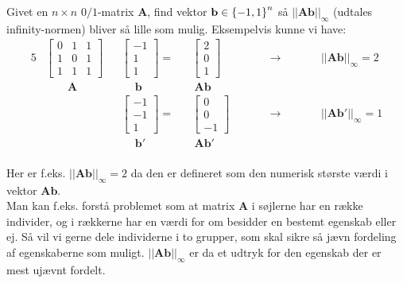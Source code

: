Givet en $n \times n$ $0/1$-matrix $\mathbf A$, find vektor $\mathbf b \in \left\{ -1, 1 \right\}^n$ så $||\mathbf{Ab}||_\infty$ (udtales infinity-normen) bliver så lille som mulig. Eksempelvis kunne vi have:
\begin{alignat*}{5}
  &\begin{bmatrix}
  0 & 1 & 1\\
  1 & 0 & 1\\
  1 & 1 & 1
  \end{bmatrix}
  &&\begin{bmatrix}
  -1\\
  1\\
  1
  \end{bmatrix}
  =
  &&\begin{bmatrix}
  2\\
  0\\
  1
  \end{bmatrix}
  \quad\quad &&\rightarrow \quad\quad
  &&||\mathbf{Ab}||_\infty = 2\\
  &\quad\quad \mathbf A
  &&\quad \ \mathbf b
  && \ \mathbf{Ab}\\
  &
  &&\begin{bmatrix}
  -1\\
  -1\\
  1
  \end{bmatrix}
  =
  &&\begin{bmatrix}
  0\\
  0\\
  -1
  \end{bmatrix}
  \quad\quad &&\rightarrow \quad\quad
  &&||\mathbf{Ab'}||_\infty = 1\\
  &
  &&\quad \ \mathbf b'
  && \ \mathbf{Ab'}\\
\end{alignat*}

Her er f.eks. $||\mathbf{Ab}||_\infty = 2$ da den er defineret som den numerisk største værdi i vektor $\mathbf{Ab}$.\\

Man kan f.eks. forstå problemet som at matrix $\mathbf A$ i søjlerne har en række individer, og i rækkerne har en værdi for om besidder en bestemt egenskab eller ej. Så vil vi gerne dele individerne i to grupper, som skal sikre så jævn fordeling af egenskaberne som muligt. $||\mathbf{Ab}||_\infty$ er da et udtryk for den egenskab der er mest ujævnt fordelt.







